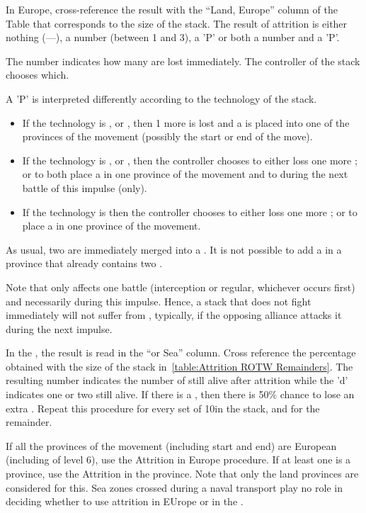 In Europe, cross-reference the result with the ``Land, Europe'' column of the
Table that corresponds to the size of the stack. The result of attrition is
either nothing (---), a number (between 1 and 3), a 'P' or both a number and a
'P'.

The number indicates how many \LD are lost immediately. The controller of the
stack chooses which.

A 'P' is interpreted differently according to the technology of the stack.
\begin{itemize}
\item If the technology is \TMED, \TREN or \TARQ, then 1 more \LD is lost and
  a \PILLAGE\facemoins is placed into one of the provinces of the movement
  (possibly the start or end of the move).
\item If the technology is \TMUS, \TBAR or \TMAN, then the controller chooses
  to either loss one more \LD; or to both place a \PILLAGE\facemoins in one
  province of the movement and to  during the next battle of
  this impulse (only).
\item If the technology is \TL then the controller chooses
  to either loss one more \LD; or to place a \PILLAGE\facemoins in one
  province of the movement.
\end{itemize}
As usual, two \PILLAGE\Facemoins are immediately merged into a
\PILLAGE\Faceplus. It is not possible to add a \PILLAGE in a province that
already contains two \PILLAGE\Faceplus.

Note that  only affects one battle (interception or regular,
whichever occurs first) and necessarily during this impulse. Hence, a stack
that does not fight immediately will not suffer from ,
typically, if the opposing alliance attacks it during the next impulse.

\smallskip

In the \ROTW, the result is read in the ``\ROTW or Sea'' column. Cross
reference the percentage obtained with the size of the stack
in~\ref{table:Attrition ROTW Remainders}. The resulting number indicates the
number of \LD still alive after attrition while the 'd' indicates one or two
\LDE still alive. If there is a \textetoile, then there is 50\% chance to lose
an extra \LDE. Repeat this procedure for every set of 10\LD in the stack, and
for the remainder.

If all the provinces of the movement (including start and end) are European
(including \COL of level 6), use the Attrition in Europe procedure. If at
least one is a \ROTW province, use the Attrition in the \ROTW province. Note
that only the land provinces are considered for this. Sea zones crossed during
a naval transport play no role in deciding whether to use attrition in EUrope
or in the \ROTW.


